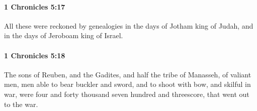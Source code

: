 		\paragraph{1 Chronicles 5:17} %
			\label{1CHRONICLES-5-17}

			All these were reckoned by genealogies in the days of Jotham king of Judah, and in the days of Jeroboam king of Israel.


		\paragraph{1 Chronicles 5:18} %
			\label{1CHRONICLES-5-18}

			The sons of Reuben, and the Gadites, and half the tribe of Manasseh, of valiant men, men able to bear buckler and sword, and to shoot with bow, and skilful in war, were four and forty thousand seven hundred and threescore, that went out to the war.

